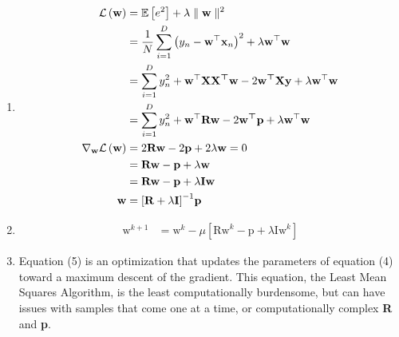 \documentclass[11pt]{article}
\begin{document}
\begin{enumerate}
    \item
    \begin{align}
    \mathcal{L}\left(\bm{\mathrm {w}}\right)&=\mathbb{E}\left[e^2 \right]+\lambda \parallel \bm{\mathrm {w}}\parallel ^2\\
    \notag&=\frac{1}{N}\sum_{i=1}^{D}{\left(y_n-\bm{\mathrm{w}}^\top\bm{\mathrm{x}}_n\right)}^2+\lambda \bm{\mathrm{w}}^\top\bm{\mathrm{w}}\\
    \notag&=\sum_{i=1}^{D}y_n^2+\bm{\mathrm{w}}^\top\bm{\mathrm{XX^\top w}}-2\bm{\mathrm{w^\top Xy}}+\lambda \bm{\mathrm{w}}^\top\bm{\mathrm{w}}\\
    \notag&=\sum_{i=1}^{D}y_n^2+\bm{\mathrm{w}}^\top\bm{\mathrm{Rw}}-2\bm{\mathrm{w^\top p}}+\lambda \bm{\mathrm{w}}^\top\bm{\mathrm{w}}\\
    \nabla_{\bm{\mathrm{w}}}\mathcal{L}\left(\bm{\mathrm {w}}\right)&=2\bm{\mathrm{Rw}}-2\bm{\mathrm{p}}+2\lambda\bm{\mathrm{w}}=0\\
    \notag&=\bm{\mathrm{Rw}}-\bm{\mathrm{p}}+\lambda\bm{\mathrm{w}}\\
    \notag&=\bm{\mathrm{Rw}}-\bm{\mathrm{p}}+\lambda\bm{\mathrm{Iw}}\\
    \bm{\mathrm{w}}&={\left[\bm{\mathrm{R}}+\lambda\bm{\mathrm{I}}\right]}^{-1}\bm{\mathrm{p}}
    \end{align}
    \item
    \begin{align}
    \bm{\mathrm{w}}^{k+1}&=\bm{\mathrm{w}}^{k}-\mu{\left[\bm{\mathrm{Rw}}^{k}-\bm{\mathrm{p}}+\lambda\bm{\mathrm{Iw}}^{k}\right]}
    \end{align}
    \item Equation (5) is an optimization that updates the parameters of equation (4) toward a maximum descent of the gradient. This equation, the Least Mean Squares Algorithm, is the least computationally burdensome, but can have issues with samples that come one at a time, or computationally complex \textbf{R} and \textbf{p}.
\end{enumerate}
\end{document}
